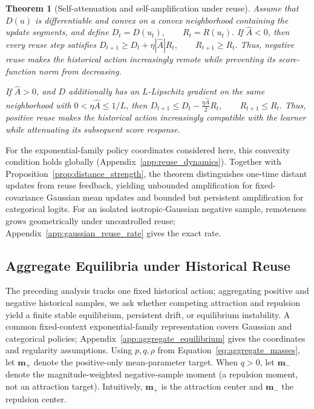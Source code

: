 \documentclass{article}
\theoremstyle{plain}
\newtheorem{theorem}{Theorem}[section]
\theoremstyle{definition}
\theoremstyle{remark}
\begin{document}
\begin{theorem}[Self-attenuation and self-amplification under reuse]
\label{thm:reuse_dynamics}
Assume that \(D(u)\) is differentiable and convex on a convex
neighborhood containing the update segments, and define
\(
    D_t=D(u_t),
    \qquad
    R_t=R(u_t).
\)
If \(\widehat A<0\), then every reuse step satisfies
\(
    D_{t+1}
    \ge
    D_t+\eta|\widehat A|R_t,
    \qquad
    R_{t+1}\ge R_t.
\)
Thus, negative reuse makes the historical action increasingly remote
while preventing its score-function norm from decreasing.

If \(\widehat A>0\), and \(D\) additionally has an \(L\)-Lipschitz
gradient on the same neighborhood with \(0<\eta\widehat A\le 1/L\), then
\(
    D_{t+1}
    \le
    D_t-\frac{\eta\widehat A}{2}R_t,
    \qquad
    R_{t+1}\le R_t.
\)
Thus, positive reuse makes the historical action increasingly compatible
with the learner while attenuating its subsequent score response.
\end{theorem}

For the exponential-family policy coordinates considered here, this convexity
condition holds globally (Appendix~\ref{app:reuse_dynamics}).
Together with Proposition~\ref{prop:distance_strength}, the theorem
distinguishes one-time distant updates from reuse feedback, yielding unbounded
amplification for fixed-covariance Gaussian mean updates and bounded but
persistent amplification for categorical logits.
For an isolated isotropic-Gaussian negative sample, remoteness grows
geometrically under uncontrolled reuse; Appendix~\ref{app:gaussian_reuse_rate}
gives the exact rate.

\subsection{Aggregate Equilibria under Historical Reuse}
\label{sec:aggregate_equilibria}

The preceding analysis tracks one fixed historical action; aggregating
positive and negative historical samples, we ask whether competing attraction
and repulsion yield a finite stable equilibrium, persistent drift, or
equilibrium instability.
A common fixed-context exponential-family representation covers Gaussian and
categorical policies; Appendix~\ref{app:aggregate_equilibrium} gives the
coordinates and regularity assumptions. Using \(p,q,\rho\) from Equation~\eqref{eq:aggregate_masses}, let
\(\mathbf m_+\) denote the positive-only mean-parameter target. When \(q>0\), let \(\mathbf m_-\)
denote the magnitude-weighted negative-sample moment (a repulsion moment,
not an attraction target). Intuitively, \(\mathbf m_+\) is the attraction center
and \(\mathbf m_-\) the repulsion center.
\end{document}
